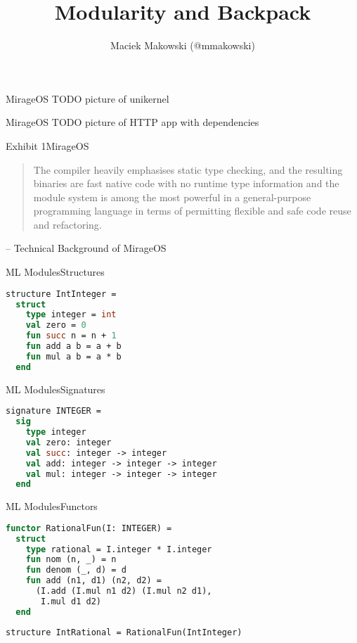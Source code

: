 \documentclass{beamer}
\begin{document}
\title{Modularity and Backpack}
\author{Maciek Makowski (@mmakowski)}

\frame{\titlepage}

\begin{frame}{MirageOS}
TODO picture of unikernel
\end{frame}

\begin{frame}{MirageOS}
TODO picture of HTTP app with dependencies
\end{frame}

\begin{frame}{Exhibit 1}{MirageOS}
\begin{quote}
The compiler heavily emphasises static type checking, and the resulting binaries are fast native code with no runtime type information and the module system is among the most powerful in a general-purpose programming language in terms of permitting flexible and safe code reuse and refactoring.
\end{quote}
-- Technical Background of MirageOS
\end{frame}

\begin{frame}[fragile]{ML Modules}{Structures}
\begin{lstlisting}[language=ML]
structure IntInteger =
  struct
    type integer = int
    val zero = 0
    fun succ n = n + 1
    fun add a b = a + b
    fun mul a b = a * b
  end
\end{lstlisting}
\end{frame}

\begin{frame}[fragile]{ML Modules}{Signatures}
\begin{lstlisting}[language=ML]
signature INTEGER =
  sig
    type integer
    val zero: integer
    val succ: integer -> integer
    val add: integer -> integer -> integer
    val mul: integer -> integer -> integer
  end
\end{lstlisting}
\end{frame}

\begin{frame}[fragile]{ML Modules}{Functors}
\begin{lstlisting}[language=ML]
functor RationalFun(I: INTEGER) =
  struct
    type rational = I.integer * I.integer
    fun nom (n, _) = n
    fun denom (_, d) = d
    fun add (n1, d1) (n2, d2) =
      (I.add (I.mul n1 d2) (I.mul n2 d1),
       I.mul d1 d2)
  end
\end{lstlisting}
\begin{lstlisting}[language=ML]
structure IntRational = RationalFun(IntInteger)
\end{lstlisting}
\end{frame}
\end{document}
